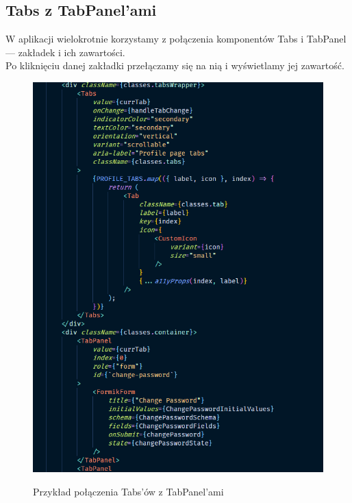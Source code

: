 \documentclass[a4paper,11pt]{report}
\begin{document}
\subsection{Tabs z TabPanel'ami}
\label{subsec:tabs}
W aplikacji wielokrotnie korzystamy z połączenia komponentów Tabs i TabPanel — zakładek i ich zawartości.\\
Po kliknięciu danej zakładki przełączamy się na nią i wyświetlamy jej zawartość.
\begin{figure}[H]
	\centering
	\includegraphics[scale=0.5]{implementacja/frontend/tabs}\\
	\caption{Przykład połączenia Tabs'ów z TabPanel'ami}
	\label{fig:tabs}
\end{figure}
\end{document}
